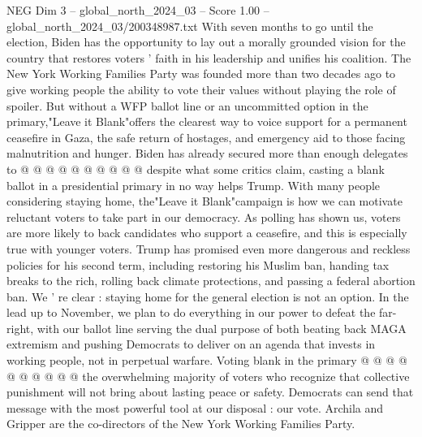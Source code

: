 \begin{textsample}{NEG Dim 3 – global\_north\_2024\_03 – Score 1.00 – global\_north\_2024\_03/200348987.txt}
With seven months to go until the election, Biden has the opportunity to lay out a morally grounded vision for the country that restores voters ' faith in his leadership and unifies his coalition.
The New York Working Families Party was founded more than two decades ago to give working people the ability to vote their values without playing the role of spoiler.
But without a WFP ballot line or an uncommitted option in the primary,"Leave it Blank"offers the clearest way to voice support for a permanent ceasefire in Gaza, the safe return of hostages, and emergency aid to those facing malnutrition and hunger.
Biden has already secured more than enough delegates to @ @ @ @ @ @ @ @ @ @ despite what some critics claim, casting a blank ballot in a presidential primary in no way helps Trump.
With many people considering staying home, the"Leave it Blank"campaign is how we can motivate reluctant voters to take part in our democracy.
As polling has shown us, voters are more likely to back candidates who support a ceasefire, and this is especially true with younger voters.
Trump has promised even more dangerous and reckless policies for his second term, including restoring his Muslim ban, handing tax breaks to the rich, rolling back climate protections, and passing a federal abortion ban.
We ' re clear : staying home for the general election is not an option.
In the lead up to November, we plan to do everything in our power to defeat the far-right, with our ballot line serving the dual purpose of both beating back MAGA extremism and pushing Democrats to deliver on an agenda that invests in working people, not in perpetual warfare.
Voting blank in the primary @ @ @ @ @ @ @ @ @ @ the overwhelming majority of voters who recognize that collective punishment will not bring about lasting peace or safety.
Democrats can send that message with the most powerful tool at our disposal : our vote.
Archila and Gripper are the co-directors of the New York Working Families Party.

\end{textsample}
